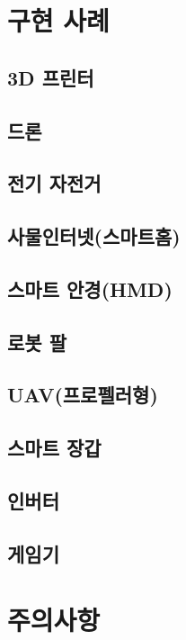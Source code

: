 \documentclass[12pt, a4paper, oneside]{book}
\let\stdsection\section
\renewcommand\section{\newpage\stdsection}
\begin{document}
	\section{ 구현 사례 }



	\subsection{ 3D 프린터}
	\subsection{ 드론}
	\subsection{ 전기 자전거}
	\subsection{ 사물인터넷(스마트홈)}
	\subsection{ 스마트 안경(HMD) }
	\subsection{ 로봇 팔}
	\subsection{ UAV(프로펠러형) }
	\subsection{ 스마트 장갑 }
	\subsection{ 인버터 }
	\subsection{ 게임기 }


	\section{ 주의사항 }
\end{document}

